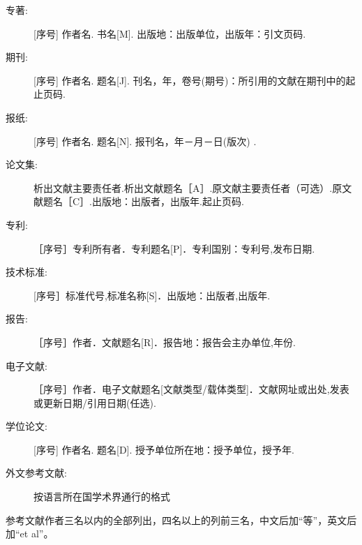 \begin{description}
    \item[专著:] [序号] 作者名. 书名[M]. 出版地：出版单位，出版年：引文页码. 
    \item[期刊:] [序号] 作者名. 题名[J]. 刊名，年，卷号(期号)：所引用的文献在期刊中的起止页码. 
    \item[报纸:] [序号] 作者名. 题名[N]. 报刊名，年－月－日(版次) .
    \item[论文集:] 析出文献主要责任者.析出文献题名［A］.原文献主要责任者（可选）.原文献题名［C］.出版地：出版者，出版年.起止页码.
    \item[专利:] ［序号］专利所有者．专利题名[P]．专利国别：专利号,发布日期.
    \item[技术标准:] [序号］标准代号,标准名称[S]．出版地：出版者,出版年.
    \item[报告:] ［序号］作者．文献题名[R]．报告地：报告会主办单位,年份.
    \item[电子文献:] ［序号］作者．电子文献题名[文献类型/载体类型]．文献网址或出处,发表或更新日期/引用日期(任选). 
    \item[学位论文:] [序号] 作者名. 题名[D]. 授予单位所在地：授予单位，授予年.
    \item[外文参考文献:] 按语言所在国学术界通行的格式
\end{description}

参考文献作者三名以内的全部列出，四名以上的列前三名，中文后加“等”，英文后加“et al”。